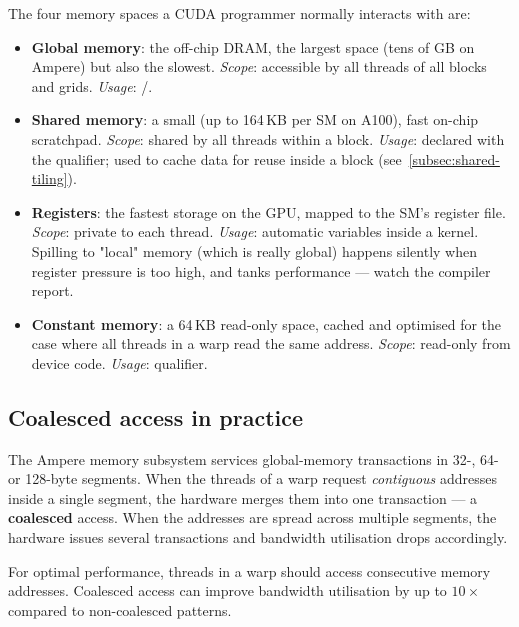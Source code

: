 The four memory spaces a CUDA programmer normally interacts with are:

\begin{itemize}
    \item \textbf{Global memory}: the off-chip DRAM, the largest space (tens of GB on Ampere) but also the slowest. \textit{Scope}: accessible by all threads of all blocks and grids. \textit{Usage}: /.
    \item \textbf{Shared memory}: a small (up to 164\,KB per SM on A100), fast on-chip scratchpad. \textit{Scope}: shared by all threads within a block. \textit{Usage}: declared with the  qualifier; used to cache data for reuse inside a block (see~\ref{subsec:shared-tiling}).
    \item \textbf{Registers}: the fastest storage on the GPU, mapped to the SM's register file. \textit{Scope}: private to each thread. \textit{Usage}: automatic variables inside a kernel. Spilling to "local" memory (which is really global) happens silently when register pressure is too high, and tanks performance --- watch the compiler report.
    \item \textbf{Constant memory}: a 64\,KB read-only space, cached and optimised for the case where all threads in a warp read the same address. \textit{Scope}: read-only from device code. \textit{Usage}:  qualifier.
\end{itemize}

\subsection{Coalesced access in practice}

The Ampere memory subsystem services global-memory transactions in 32-, 64- or 128-byte segments. When the threads of a warp request \emph{contiguous} addresses inside a single segment, the hardware merges them into one transaction --- a \textbf{coalesced} access. When the addresses are spread across multiple segments, the hardware issues several transactions and bandwidth utilisation drops accordingly.

\begin{tipsblock}
For optimal performance, threads in a warp should access consecutive memory addresses. Coalesced access can improve bandwidth utilisation by up to $10\times$ compared to non-coalesced patterns.
\end{tipsblock}

